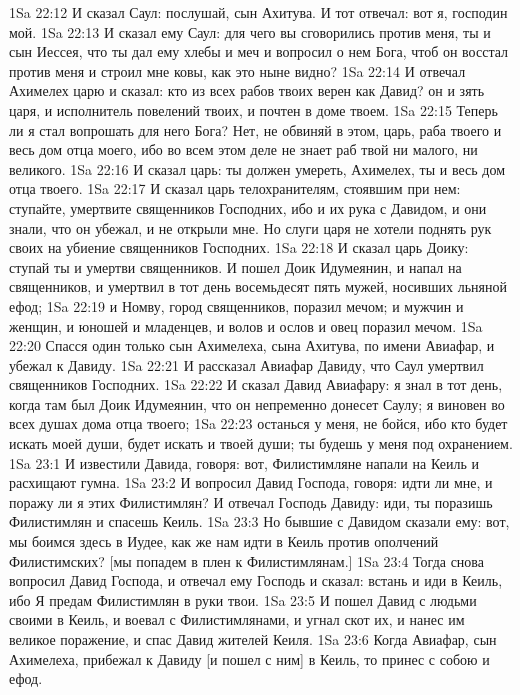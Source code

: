 \vs 1Sa 22:12 И сказал Саул: послушай, сын Ахитува. И тот отвечал: вот я, господин мой.
\vs 1Sa 22:13 И сказал ему Саул: для чего вы сговорились против меня, ты и сын Иессея, что ты дал ему хлебы и меч и вопросил о нем Бога, чтоб он восстал против меня и строил мне ковы, как это ныне видно?
\vs 1Sa 22:14 И отвечал Ахимелех царю и сказал: кто из всех рабов твоих верен как Давид? он и зять царя, и исполнитель повелений твоих, и почтен в доме твоем.
\vs 1Sa 22:15 Теперь ли я стал вопрошать для него Бога? Нет, не обвиняй в этом, царь, раба твоего и весь дом отца моего, ибо во всем этом деле не знает раб твой ни малого, ни великого.
\vs 1Sa 22:16 И сказал царь: ты должен умереть, Ахимелех, ты и весь дом отца твоего.
\vs 1Sa 22:17 И сказал царь телохранителям, стоявшим при нем: ступайте, умертвите священников Господних, ибо и их рука с Давидом, и они знали, что он убежал, и не открыли мне. Но слуги царя не хотели поднять рук своих на убиение священников Господних.
\vs 1Sa 22:18 И сказал царь Доику: ступай ты и умертви священников. И пошел Доик Идумеянин, и напал на священников, и умертвил в тот день восемьдесят пять мужей, носивших льняной ефод;
\vs 1Sa 22:19 и Номву, город священников, поразил мечом; и мужчин и женщин, и юношей и младенцев, и волов и ослов и овец поразил мечом.
\vs 1Sa 22:20 Спасся один только сын Ахимелеха, сына Ахитува, по имени Авиафар, и убежал к Давиду.
\vs 1Sa 22:21 И рассказал Авиафар Давиду, что Саул умертвил священников Господних.
\vs 1Sa 22:22 И сказал Давид Авиафару: я знал в тот день, когда там был Доик Идумеянин, что он непременно донесет Саулу; я виновен во всех душах дома отца твоего;
\vs 1Sa 22:23 останься у меня, не бойся, ибо кто будет искать моей души, будет искать и твоей души; ты будешь у меня под охранением.
\vs 1Sa 23:1 И известили Давида, говоря: вот, Филистимляне напали на Кеиль и расхищают гумна.
\vs 1Sa 23:2 И вопросил Давид Господа, говоря: идти ли мне, и поражу ли я этих Филистимлян? И отвечал Господь Давиду: иди, ты поразишь Филистимлян и спасешь Кеиль.
\vs 1Sa 23:3 Но бывшие с Давидом сказали ему: вот, мы боимся здесь в Иудее, как же нам идти в Кеиль против ополчений Филистимских? [мы попадем в плен к Филистимлянам.]
\vs 1Sa 23:4 Тогда снова вопросил Давид Господа, и отвечал ему Господь и сказал: встань и иди в Кеиль, ибо Я предам Филистимлян в руки твои.
\vs 1Sa 23:5 И пошел Давид с людьми своими в Кеиль, и воевал с Филистимлянами, и угнал скот их, и нанес им великое поражение, и спас Давид жителей Кеиля.
\vs 1Sa 23:6 Когда Авиафар, сын Ахимелеха, прибежал к Давиду [и пошел с ним] в Кеиль, то принес с собою и ефод.
